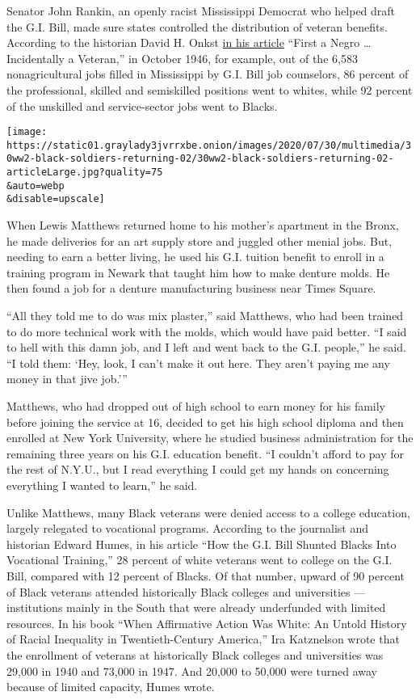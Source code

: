 Senator John Rankin, an openly racist Mississippi Democrat who helped
draft the G.I. Bill, made sure states controlled the distribution of
veteran benefits. According to the historian David H. Onkst
\href{https://www.jstor.org/stable/3789713?seq=1}{in his article}
``First a Negro \ldots{} Incidentally a Veteran,'' in October 1946, for
example, out of the 6,583 nonagricultural jobs filled in Mississippi by
G.I. Bill job counselors, 86 percent of the professional, skilled and
semiskilled positions went to whites, while 92 percent of the unskilled
and service-sector jobs went to Blacks.

\texttt{[image: https://static01.graylady3jvrrxbe.onion/images/2020/07/30/multimedia/30ww2-black-soldiers-returning-02/30ww2-black-soldiers-returning-02-articleLarge.jpg?quality=75\\\&auto=webp\\\&disable=upscale]}

When Lewis Matthews returned home to his mother's apartment in the
Bronx, he made deliveries for an art supply store and juggled other
menial jobs. But, needing to earn a better living, he used his G.I.
tuition benefit to enroll in a training program in Newark that taught
him how to make denture molds. He then found a job for a denture
manufacturing business near Times Square.

``All they told me to do was mix plaster,'' said Matthews, who had been
trained to do more technical work with the molds, which would have paid
better. ``I said to hell with this damn job, and I left and went back to
the G.I. people,'' he said. ``I told them: `Hey, look, I can't make it
out here. They aren't paying me any money in that jive job.'''

Matthews, who had dropped out of high school to earn money for his
family before joining the service at 16, decided to get his high school
diploma and then enrolled at New York University, where he studied
business administration for the remaining three years on his G.I.
education benefit. ``I couldn't afford to pay for the rest of N.Y.U.,
but I read everything I could get my hands on concerning everything I
wanted to learn,'' he said.

Unlike Matthews, many Black veterans were denied access to a college
education, largely relegated to vocational programs. According to the
journalist and historian Edward Humes, in his article ``How the G.I.
Bill Shunted Blacks Into Vocational Training,'' 28 percent of white
veterans went to college on the G.I. Bill, compared with 12 percent of
Blacks. Of that number, upward of 90 percent of Black veterans attended
historically Black colleges and universities --- institutions mainly in
the South that were already underfunded with limited resources. In his
book ``When Affirmative Action Was White: An Untold History of Racial
Inequality in Twentieth-Century America,'' Ira Katznelson wrote that the
enrollment of veterans at historically Black colleges and universities
was 29,000 in 1940 and 73,000 in 1947. And 20,000 to 50,000 were turned
away because of limited capacity, Humes wrote.

